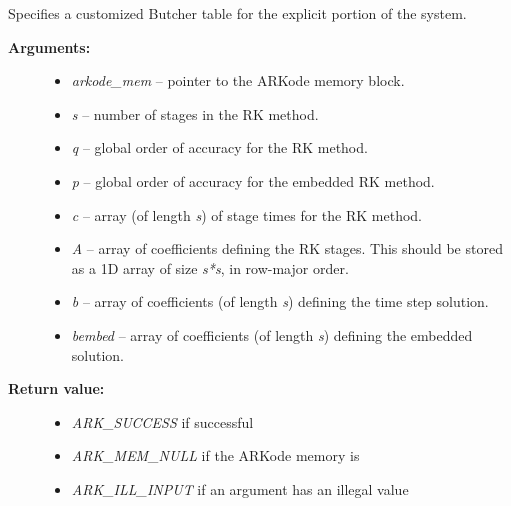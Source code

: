 \documentclass[letterpaper,10pt,english]{sphinxmanual}
\begin{document}
\begin{fulllineitems}
\label{c_interface/User_callable:c.ARKodeSetERKTable}
Specifies a customized Butcher table for the explicit portion of the system.
\begin{description}
\item[{\textbf{Arguments:}}] \leavevmode\begin{itemize}
\item {} 
\emph{arkode\_mem} -- pointer to the ARKode memory block.

\item {} 
\emph{s} -- number of stages in the RK method.

\item {} 
\emph{q} -- global order of accuracy for the RK method.

\item {} 
\emph{p} -- global order of accuracy for the embedded RK method.

\item {} 
\emph{c} -- array (of length \emph{s}) of stage times for the RK method.

\item {} 
\emph{A} -- array of coefficients defining the RK stages.  This should
be stored as a 1D array of size \emph{s*s}, in row-major order.

\item {} 
\emph{b} -- array of coefficients (of length \emph{s}) defining the time step solution.

\item {} 
\emph{bembed} -- array of coefficients (of length \emph{s}) defining the embedded solution.

\end{itemize}

\item[{\textbf{Return value:}}] \leavevmode\begin{itemize}
\item {} 
\emph{ARK\_SUCCESS} if successful

\item {} 
\emph{ARK\_MEM\_NULL} if the ARKode memory is 

\item {} 
\emph{ARK\_ILL\_INPUT} if an argument has an illegal value


\end{itemize}
\end{description}
\end{fulllineitems}
\end{document}
